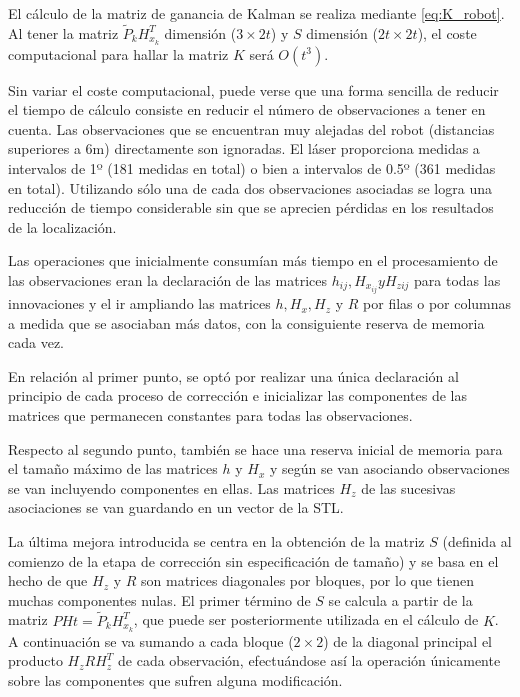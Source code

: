 El cálculo de la matriz de ganancia de Kalman se realiza mediante \ref{eq:K_robot}. Al tener la matriz $\tilde{P}_{k}H_{x_{k}}^{T}$ dimensión ($3 \times 2t$) y $S$ dimensión ($2t \times 2t$), el coste computacional para hallar la matriz $K$ será $O(t^{3})$.

Sin variar el coste computacional, puede verse que una forma sencilla de reducir el tiempo de cálculo consiste en reducir el número de observaciones a tener en cuenta. Las observaciones que se encuentran muy alejadas del robot (distancias superiores a 6m) directamente son ignoradas. El láser proporciona medidas a intervalos de 1º (181 medidas en total) o bien a intervalos de 0.5º (361 medidas en total). Utilizando sólo una de cada dos observaciones asociadas se logra una reducción de tiempo considerable sin que se aprecien pérdidas en los resultados de la localización.

Las operaciones que inicialmente consumían más tiempo en el procesamiento de las observaciones eran la declaración de las matrices $h_{ij}, H_{x_{ij}} y H_{z{ij}}$ para todas las innovaciones y el ir ampliando las matrices $h, H_{x}, H_{z}$ y $R$ por filas o por columnas a medida que se asociaban más datos, con la consiguiente reserva de memoria cada vez.

En relación al primer punto, se optó por realizar una única declaración al principio de cada proceso de corrección e inicializar las componentes de las matrices que permanecen constantes para todas las observaciones.

Respecto al segundo punto, también se hace una reserva inicial de memoria para el tamaño máximo de las matrices $h$ y $H_{x}$ y según se van asociando observaciones se van incluyendo componentes en ellas. Las matrices $H_{z}$ de las sucesivas asociaciones se van guardando en un vector de la STL.

La última mejora introducida se centra en la obtención de la matriz $S$ (definida al comienzo de la etapa de corrección sin especificación de tamaño) y se basa en el hecho de que $H_{z}$ y $R$ son matrices diagonales por bloques, por lo que tienen muchas componentes nulas. El primer término de $S$ se calcula a partir de la matriz $PHt = \tilde{P}_{k}H_{x_{k}}^{T}$, que puede ser posteriormente utilizada en el cálculo de $K$. A continuación se va sumando a cada bloque ($2 \times 2$) de la diagonal principal el producto $H_{z}RH_{z}^{T}$ de cada observación, efectuándose así la operación únicamente sobre las componentes que sufren alguna modificación.

